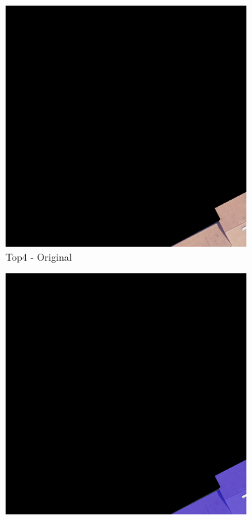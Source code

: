 \begin{figure}[H]
\begin{subfigure}{0.32\textwidth}
    \includegraphics[width=\textwidth]{02-main//figures/ch4/kfold_ensembles/upernet_tu-efficientnetv2_rw_s.ra2_in1k/best_cases/best_2_iou0.984_24931113_tile_13_18_a66e08_original.png}
    \caption{Top4 - Original}
\end{subfigure}
\hfill
\begin{subfigure}{0.32\textwidth}
    \includegraphics[width=\textwidth]{02-main//figures/ch4/kfold_ensembles/upernet_tu-efficientnetv2_rw_s.ra2_in1k/best_cases/best_2_iou0.984_24931113_tile_13_18_a66e08_overlay_gt.png}

\end{subfigure}
\end{figure}
